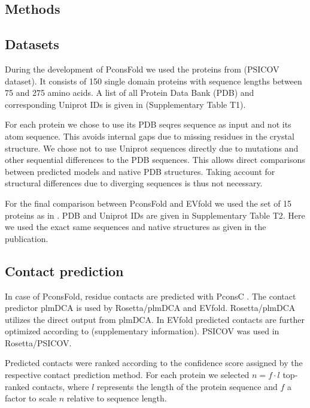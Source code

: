 \documentclass{bioinfo}
\begin{document}
\begin{methods}
\section{Methods}

\subsection{Datasets}
During the development of PconsFold we used the proteins from
\citeauthor{jones_PSICOV:_2012} \citeyear{jones_PSICOV:_2012} (PSICOV
dataset). It consists of 150 single domain proteins with sequence
lengths between 75 and 275 amino acids. A list of all Protein Data
Bank (PDB) \cite[]{berman_protein_2000} and corresponding Uniprot
\cite[]{magrane_uniprot_2011} IDs is given in (Supplementary Table
T1). 


For each protein we chose to use its PDB seqres sequence as input and
not its atom sequence. This avoids internal gaps due to missing
residues in the crystal structure. We chose not to use Uniprot
sequences directly due to mutations and other sequential differences
to the PDB sequences. This allows direct comparisons between predicted
models and native PDB structures. Taking account for structural
differences due to diverging sequences is thus not necessary. 


For the final comparison between PconsFold and EVfold we used the set
of 15 proteins as in \citeauthor{marks_protein_2011}
\citeyear{marks_protein_2011} . PDB and Uniprot IDs are given in
Supplementary Table T2. Here we used the exact same sequences and
native structures as given in the publication.  

\subsection{Contact prediction}
In case of PconsFold, residue contacts are predicted with PconsC
\cite[]{skwark_PconsC:_2013}. The contact predictor plmDCA
\cite[]{ekeberg_improved_2013} is used by Rosetta/plmDCA and
EVfold. Rosetta/plmDCA utilizes the direct output from plmDCA. In
EVfold predicted contacts are further optimized according to
\citeauthor{marks_protein_2011} \citeyear{marks_protein_2011}
(supplementary information). PSICOV was used in Rosetta/PSICOV. 


Predicted contacts were ranked according to the confidence score
assigned by the respective contact prediction method. For each protein
we selected $n = f \cdot l$ top-ranked contacts, where $l$ represents
the length of the protein sequence and $f$ a factor to scale $n$
relative to sequence length. 



\end{methods}
\end{document}
